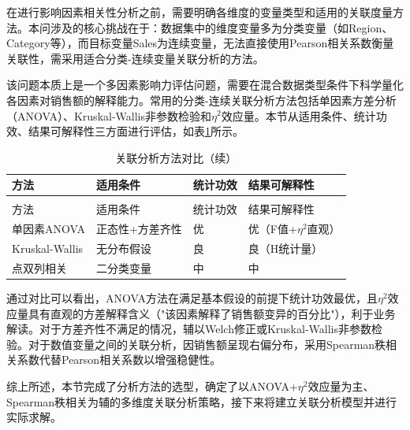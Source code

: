 在进行影响因素相关性分析之前，需要明确各维度的变量类型和适用的关联度量方法。本问涉及的核心挑战在于：数据集中的维度变量多为分类变量（如Region、Category等），而目标变量Sales为连续变量，无法直接使用Pearson相关系数衡量关联性，需采用适合分类-连续变量关联分析的方法。

该问题本质上是一个多因素影响力评估问题，需要在混合数据类型条件下科学量化各因素对销售额的解释能力。常用的分类-连续关联分析方法包括单因素方差分析（ANOVA）、Kruskal-Wallis非参数检验和$\eta^2$效应量。本节从适用条件、统计功效、结果可解释性三方面进行评估，如表\ref{tab:算法对比2}所示。

\begin{longtable}{>{\centering\arraybackslash}p{}>{\centering\arraybackslash}p{}>{\centering\arraybackslash}p{}>{\centering\arraybackslash}p{}}
  \caption{关联分析方法对比}
  \label{tab:算法对比2} \\
  \toprule
  方法 & 适用条件 & 统计功效 & 结果可解释性 \\
  \midrule
  \endfirsthead
  \caption{关联分析方法对比（续）} \\
  \toprule
  方法 & 适用条件 & 统计功效 & 结果可解释性 \\
  \midrule
  \endhead
  \bottomrule
  \endfoot
  单因素ANOVA & 正态性+方差齐性 & 优 & 优（F值+$\eta^2$直观） \\
  Kruskal-Wallis & 无分布假设 & 良 & 良（H统计量） \\
  点双列相关 & 二分类变量 & 中 & 中 \\
\end{longtable}

通过对比可以看出，ANOVA方法在满足基本假设的前提下统计功效最优，且$\eta^2$效应量具有直观的方差解释含义（"该因素解释了销售额变异的百分比"），利于业务解读。对于方差齐性不满足的情况，辅以Welch修正或Kruskal-Wallis非参数检验。对于数值变量之间的关联分析，因销售额呈现右偏分布，采用Spearman秩相关系数代替Pearson相关系数以增强稳健性。

综上所述，本节完成了分析方法的选型，确定了以ANOVA+$\eta^2$效应量为主、Spearman秩相关为辅的多维度关联分析策略，接下来将建立关联分析模型并进行实际求解。
